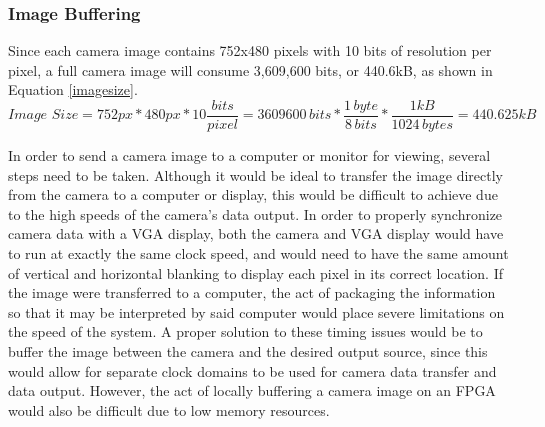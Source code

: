 \subsubsection{Image Buffering}
Since each camera image contains 752x480 pixels with 10 bits of resolution per pixel, a full camera image will consume 3,609,600 bits, or 440.6kB, as shown in Equation \ref{imagesize}.
\begin{equation} \label{imagesize}
Image\,\,Size = 752px*480px*10\frac{bits}{pixel} = 3609600\,bits*\frac{1\,byte}{8\,bits}*\frac{1 kB}{1024\,bytes} = 440.625kB
\end{equation}
\par
In order to send a camera image to a computer or monitor for viewing, several steps need to be taken. Although it would be ideal to transfer the image directly from the camera to a computer or display, this would be difficult to achieve due to the high speeds of the camera's data output. In order to properly synchronize camera data with a VGA display, both the camera and VGA display would have to run at exactly the same clock speed, and would need to have the same amount of vertical and horizontal blanking to display each pixel in its correct location. If the image were transferred to a computer, the act of packaging the information so that it may be interpreted by said computer would place severe limitations on the speed of the system. A proper solution to these timing issues would be to buffer the image between the camera and the desired output source, since this would allow for separate clock domains to be used for camera data transfer and data output. However, the act of locally buffering a camera image on an FPGA would also be difficult due to low memory resources. 
\par
